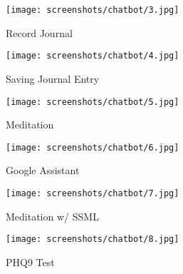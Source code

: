 \pagebreak

\vspace*{\fill}
\begin{figure}[H]
    \centering
    \begin{minipage}{0.45\textwidth}
        \centering
        \texttt{[image: screenshots/chatbot/3.jpg]}
        \caption{Record Journal}
    \end{minipage}\hfill
    \begin{minipage}{0.45\textwidth}
        \centering
        \texttt{[image: screenshots/chatbot/4.jpg]}
        \caption{Saving Journal Entry}
    \end{minipage}
\end{figure}
\vspace*{\fill}

\pagebreak

\vspace*{\fill}
\begin{figure}[H]
    \centering
    \begin{minipage}{0.45\textwidth}
        \centering
        \texttt{[image: screenshots/chatbot/5.jpg]}
        \caption{Meditation}
    \end{minipage}\hfill
    \begin{minipage}{0.45\textwidth}
        \centering
        \texttt{[image: screenshots/chatbot/6.jpg]}
        \caption{Google Assistant}
    \end{minipage}
\end{figure}
\vspace*{\fill}

\pagebreak

\vspace*{\fill}
\begin{figure}[H]
    \centering
    \begin{minipage}{0.45\textwidth}
        \centering
        \texttt{[image: screenshots/chatbot/7.jpg]}
        \caption{Meditation w/ SSML}
    \end{minipage}\hfill
    \begin{minipage}{0.45\textwidth}
        \centering
        \texttt{[image: screenshots/chatbot/8.jpg]}
        \caption{PHQ9 Test}
    \end{minipage}
\end{figure}
\vspace*{\fill}

\pagebreak

